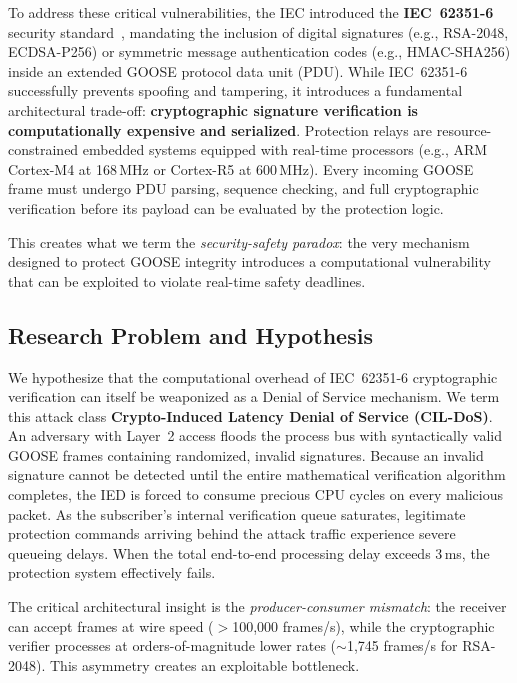 \documentclass{ieeeaccess}
\begin{document}
To address these critical vulnerabilities, the IEC introduced the \textbf{IEC~62351-6} security standard~\cite{iec62351}, mandating the inclusion of digital signatures (e.g., RSA-2048, ECDSA-P256) or symmetric message authentication codes (e.g., HMAC-SHA256) inside an extended GOOSE protocol data unit (PDU). While IEC~62351-6 successfully prevents spoofing and tampering, it introduces a fundamental architectural trade-off: \textbf{cryptographic signature verification is computationally expensive and serialized}. Protection relays are resource-constrained embedded systems equipped with real-time processors (e.g., ARM Cortex-M4 at 168\,MHz or Cortex-R5 at 600\,MHz). Every incoming GOOSE frame must undergo PDU parsing, sequence checking, and full cryptographic verification before its payload can be evaluated by the protection logic.

This creates what we term the \emph{security-safety paradox}: the very mechanism designed to protect GOOSE integrity introduces a computational vulnerability that can be exploited to violate real-time safety deadlines.

\subsection{Research Problem and Hypothesis}
We hypothesize that the computational overhead of IEC~62351-6 cryptographic verification can itself be weaponized as a Denial of Service mechanism. We term this attack class \textbf{Crypto-Induced Latency Denial of Service (CIL-DoS)}. An adversary with Layer~2 access floods the process bus with syntactically valid GOOSE frames containing randomized, invalid signatures. Because an invalid signature cannot be detected until the entire mathematical verification algorithm completes, the IED is forced to consume precious CPU cycles on every malicious packet. As the subscriber's internal verification queue saturates, legitimate protection commands arriving behind the attack traffic experience severe queueing delays. When the total end-to-end processing delay exceeds 3\,ms, the protection system effectively fails.

The critical architectural insight is the \emph{producer-consumer mismatch}: the receiver can accept frames at wire speed ($>$100,000 frames/s), while the cryptographic verifier processes at orders-of-magnitude lower rates ($\sim$1,745 frames/s for RSA-2048). This asymmetry creates an exploitable bottleneck.
\end{document}
